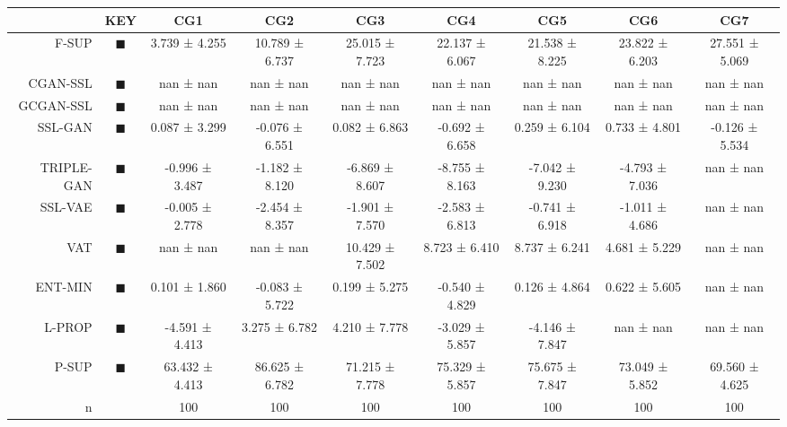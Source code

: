 \begin{tabular}{rcccccccc}
\toprule
 & KEY & CG1 & CG2 & CG3 & CG4 & CG5 & CG6 & CG7 \\
\midrule
F-SUP & \textcolor{FULLY_SUPERVISED_CLASSIFIER}{\LARGE $\blacksquare$} & 3.739 ± 4.255 & 10.789 ± 6.737 & 25.015 ± 7.723 & 22.137 ± 6.067 & 21.538 ± 8.225 & 23.822 ± 6.203 & 27.551 ± 5.069 \\
CGAN-SSL & \textcolor{CGAN_BASIC_DJ_SUPERVISED_CLASSIFIER}{\LARGE $\blacksquare$} & nan ± nan & nan ± nan & nan ± nan & nan ± nan & nan ± nan & nan ± nan & nan ± nan \\
GCGAN-SSL & \textcolor{CGAN_GUMBEL_DJ_SUPERVISED_CLASSIFIER}{\LARGE $\blacksquare$} & nan ± nan & nan ± nan & nan ± nan & nan ± nan & nan ± nan & nan ± nan & nan ± nan \\
SSL-GAN & \textcolor{SSL_GAN}{\LARGE $\blacksquare$} & 0.087 ± 3.299 & -0.076 ± 6.551 & 0.082 ± 6.863 & -0.692 ± 6.658 & 0.259 ± 6.104 & 0.733 ± 4.801 & -0.126 ± 5.534 \\
TRIPLE-GAN & \textcolor{TRIPLE_GAN}{\LARGE $\blacksquare$} & -0.996 ± 3.487 & -1.182 ± 8.120 & -6.869 ± 8.607 & -8.755 ± 8.163 & -7.042 ± 9.230 & -4.793 ± 7.036 & nan ± nan \\
SSL-VAE & \textcolor{SSL_VAE}{\LARGE $\blacksquare$} & -0.005 ± 2.778 & -2.454 ± 8.357 & -1.901 ± 7.570 & -2.583 ± 6.813 & -0.741 ± 6.918 & -1.011 ± 4.686 & nan ± nan \\
VAT & \textcolor{VAT}{\LARGE $\blacksquare$} & nan ± nan & nan ± nan & 10.429 ± 7.502 & 8.723 ± 6.410 & 8.737 ± 6.241 & 4.681 ± 5.229 & nan ± nan \\
ENT-MIN & \textcolor{ENTROPY_MINIMISATION}{\LARGE $\blacksquare$} & 0.101 ± 1.860 & -0.083 ± 5.722 & 0.199 ± 5.275 & -0.540 ± 4.829 & 0.126 ± 4.864 & 0.622 ± 5.605 & nan ± nan \\
L-PROP & \textcolor{LABEL_PROPAGATION}{\LARGE $\blacksquare$} & -4.591 ± 4.413 & 3.275 ± 6.782 & 4.210 ± 7.778 & -3.029 ± 5.857 & -4.146 ± 7.847 & nan ± nan & nan ± nan \\
P-SUP & \textcolor{PARTIAL_SUPERVISED_CLASSIFIER}{\LARGE $\blacksquare$} & 63.432 ± 4.413 & 86.625 ± 6.782 & 71.215 ± 7.778 & 75.329 ± 5.857 & 75.675 ± 7.847 & 73.049 ± 5.852 & 69.560 ± 4.625 \\
n &  & 100 & 100 & 100 & 100 & 100 & 100 & 100 \\
\bottomrule
\end{tabular}
